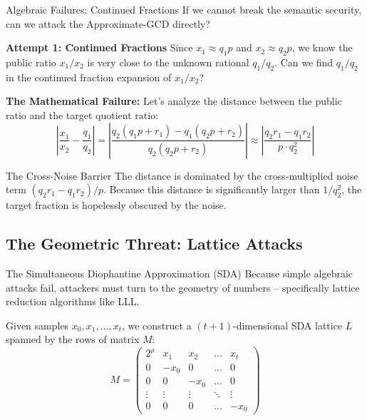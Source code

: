 \documentclass[10pt]{beamer}
\begin{document}
\begin{frame}{Algebraic Failures: Continued Fractions}
    If we cannot break the semantic security, can we attack the Approximate-GCD directly?
    
    \vspace{0.2cm}
    \textbf{Attempt 1: Continued Fractions}
    Since $x_1 \approx q_1 p$ and $x_2 \approx q_2 p$, we know the public ratio $x_1 / x_2$ is very close to the unknown rational $q_1 / q_2$. Can we find $q_1/q_2$ in the continued fraction expansion of $x_1/x_2$?
    \pause
    
    \vspace{0.2cm}
    \textbf{The Mathematical Failure:}
    Let's analyze the distance between the public ratio and the target quotient ratio:
    $$ \left| \frac{x_1}{x_2} - \frac{q_1}{q_2} \right| = \left| \frac{q_2(q_1 p + r_1) - q_1(q_2 p + r_2)}{q_2(q_2 p + r_2)} \right| \approx \left| \frac{q_2 r_1 - q_1 r_2}{p \cdot q_2^2} \right| $$
    \pause
    
    \begin{block}{The Cross-Noise Barrier}
    The distance is dominated by the cross-multiplied noise term $(q_2 r_1 - q_1 r_2) / p$. Because this distance is significantly larger than $1/q_2^2$, the target fraction is hopelessly obscured by the noise.
    \end{block}
\end{frame}

\subsection{The Geometric Threat: Lattice Attacks}

\begin{frame}{The Simultaneous Diophantine Approximation (SDA)}
    Because simple algebraic attacks fail, attackers must turn to the geometry of numbers -- specifically lattice reduction algorithms like LLL.
    \pause
    
    \vspace{0.2cm}
    Given samples $x_0, x_1, \dots, x_t$, we construct a $(t+1)$-dimensional SDA lattice $L$ spanned by the rows of matrix $M$:
    $$ M = \begin{pmatrix} 
    2^\rho & x_1 & x_2 & \dots & x_t \\ 
    0 & -x_0 & 0 & \dots & 0 \\ 
    0 & 0 & -x_0 & \dots & 0 \\ 
    \vdots & \vdots & \vdots & \ddots & \vdots \\ 
    0 & 0 & 0 & \dots & -x_0 
    \end{pmatrix} $$
\end{frame}
\end{document}
